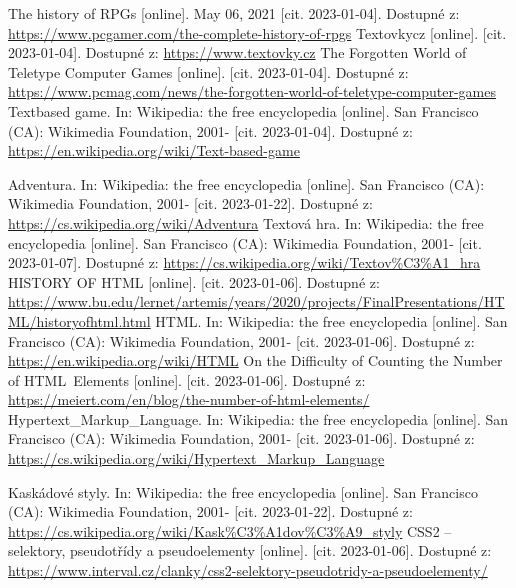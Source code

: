 \documentclass[main.tex]{subfiles}
\begin{document}
\renewcommand{\refname}{Seznam použité literatury a~zdrojů informací} 

\begin{thebibliography}{99}


 The history of RPGs [online]. May 06, 2021 [cit. 2023-01-04]. Dostupné z: \url{https://www.pcgamer.com/the-complete-history-of-rpgs}
 Textovkycz [online]. [cit. 2023-01-04]. Dostupné z: \url{https://www.textovky.cz}
 The Forgotten World of Teletype Computer Games [online]. [cit. 2023-01-04]. Dostupné z: \url{https://www.pcmag.com/news/the-forgotten-world-of-teletype-computer-games}
 Textbased game. In: Wikipedia: the free encyclopedia [online]. San Francisco (CA): Wikimedia Foundation, 2001- [cit. 2023-01-04]. Dostupné z: \url{https://en.wikipedia.org/wiki/Text-based-game}

 Adventura. In: Wikipedia: the free encyclopedia [online]. San Francisco (CA): Wikimedia Foundation, 2001- [cit. 2023-01-22]. Dostupné z: \url{https://cs.wikipedia.org/wiki/Adventura}
 Textová hra. In: Wikipedia: the free encyclopedia [online]. San Francisco (CA): Wikimedia Foundation, 2001- [cit. 2023-01-07]. Dostupné z: \url{https://cs.wikipedia.org/wiki/Textov\%C3\%A1\_hra}
 HISTORY OF HTML [online]. [cit. 2023-01-06]. Dostupné z: \url{https://www.bu.edu/lernet/artemis/years/2020/projects/FinalPresentations/HTML/historyofhtml.html} 
 HTML. In: Wikipedia: the free encyclopedia [online]. San Francisco (CA): Wikimedia Foundation, 2001- [cit. 2023-01-06]. Dostupné z: \url{https://en.wikipedia.org/wiki/HTML}
 On the Difficulty of Counting the Number of HTML Elements [online]. [cit. 2023-01-06]. Dostupné z: \url{https://meiert.com/en/blog/the-number-of-html-elements/}
 Hypertext\_Markup\_Language. In: Wikipedia: the free encyclopedia [online]. San Francisco (CA): Wikimedia Foundation, 2001- [cit. 2023-01-06]. Dostupné z: \url{https://cs.wikipedia.org/wiki/Hypertext\_Markup\_Language}

 Kaskádové styly. In: Wikipedia: the free encyclopedia [online]. San Francisco (CA): Wikimedia Foundation, 2001- [cit. 2023-01-22]. Dostupné z: \url{https://cs.wikipedia.org/wiki/Kask\%C3\%A1dov\%C3\%A9\_styly}
 CSS2 – selektory, pseudotřídy a pseudoelementy [online]. [cit. 2023-01-06]. Dostupné z: \url{https://www.interval.cz/clanky/css2-selektory-pseudotridy-a-pseudoelementy/}


\end{thebibliography}
\end{document}
